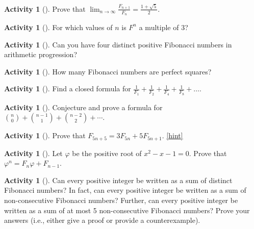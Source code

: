 \documentclass[10pt,]{book}
\theoremstyle{plain}
\theoremstyle{definition}
\theoremstyle{definition}
\theoremstyle{definition}
\newtheorem{activity}[project]{Activity}
\numberwithin{equation}{chapter}
\begin{document}
\begin{activity}[]\label{activity-156}
\hypertarget{p-977}{}%
Prove that \(\lim_{n\to\infty}\frac{F_{n + 1}}{F_{n}} = \frac{1 + \sqrt{5}}{2}.\)%
\end{activity}
\begin{activity}[]\label{activity-157}
\hypertarget{p-978}{}%
For which values of \(n\) is \(F^{n}\) a multiple of 3?%
\end{activity}
\begin{activity}[]\label{activity-158}
\hypertarget{p-979}{}%
Can you have four distinct positive Fibonacci numbers in arithmetic progression?%
\end{activity}
\begin{activity}[]\label{activity-159}
\hypertarget{p-980}{}%
How many Fibonacci numbers are perfect squares?%
\end{activity}
\begin{activity}[]\label{activity-160}
\hypertarget{p-981}{}%
Find a closed formula for \(\frac{1}{F_{1}} + \frac{1}{F_{2}} + \frac{1}{F_{4}} + \frac{1}{F_{8}} + \ldots.\)%
\end{activity}
\begin{activity}[]\label{activity-161}
\hypertarget{p-982}{}%
Conjecture and prove a formula for \(\binom{n}{0} + \binom{n-1}{1} + \binom{n-2}{2} + \cdots\).%
\end{activity}
\begin{activity}[]\label{activity-162}
\hypertarget{p-983}{}%
Prove that \(F_{5n + 5} = 3F_{5n} + 5F_{5n + 1}\).%
\hfill{\tiny\hyperlink{a-169}{[hint]}\hypertarget{q-169}{}}\end{activity}
\begin{activity}[]\label{activity-163}
\hypertarget{p-985}{}%
Let \(\varphi\) be the positive root of \(x^{2} - x - 1 = 0\). Prove that \(\varphi^{n} = F_{n}\varphi + F_{n - 1}\).%
\end{activity}
\begin{activity}[]\label{activity-164}
\hypertarget{p-986}{}%
Can every positive integer be written as a sum of distinct Fibonacci numbers?  In fact, can every positive integer be written as a sum of non-consecutive Fibonacci numbers?  Further, can every positive integer be written as a sum of at most 5 non-consecutive Fibonacci numbers?  Prove your answers (i.e., either give a proof or provide a counterexample).%
\end{activity}
\typeout{************************************************}
\typeout{************************************************}
\end{document}
